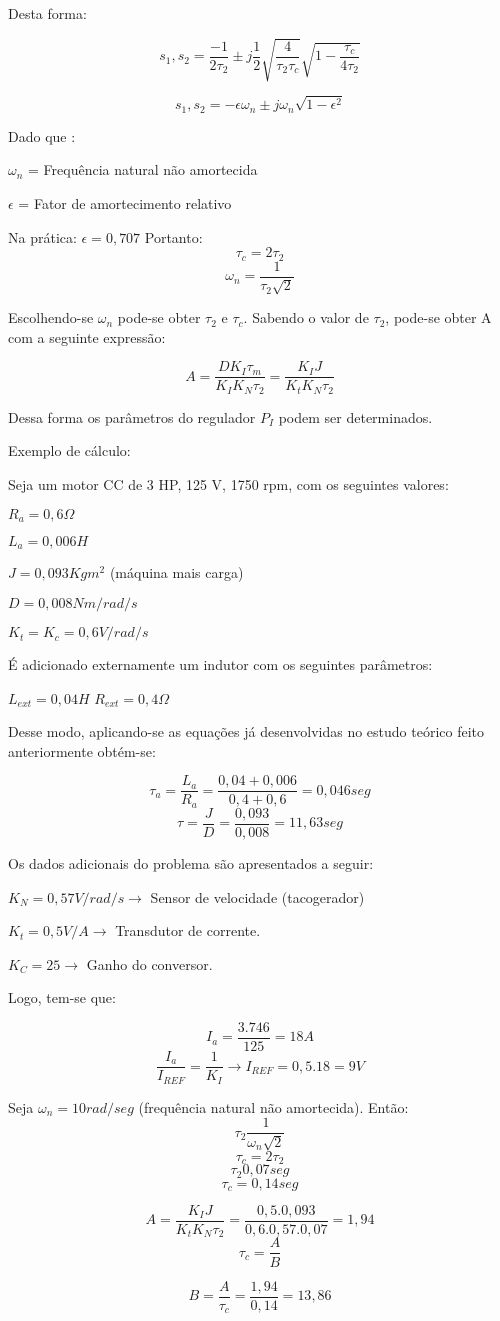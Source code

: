 Desta forma:

\[s_{1},s_{2} = \frac{-1}{2\tau_{2}} \pm j\frac{1}{2}\sqrt{\frac{4}{\tau_{2}\tau_{c}}}\sqrt{1 - \frac{\tau_{c}}{4\tau_{2}}}\]

\[s_{1},s_{2} = -\epsilon\omega_{n} \pm j\omega_{n}\sqrt{1 - \epsilon^{2}}\]

Dado que :

$\omega_{n}$ =  Frequência natural não amortecida

$\epsilon$ = Fator de amortecimento relativo


Na prática: $\epsilon = 0,707$
Portanto:
\[\tau_{c} = 2\tau_{2}\]
\[\omega_{n} = \frac{1}{\tau_{2}\sqrt{2}}\]

Escolhendo-se $\omega_{n}$ pode-se obter $\tau_{2}$ e $\tau_{c}$. Sabendo o valor de $\tau_{2}$, pode-se obter A com a seguinte expressão:

\[A = \frac{DK_{I}\tau_{m}}{K_{I}K_{N}\tau_{2}} = \frac{K_{I}J}{K_{t}K_{N}\tau_{2}}\]

Dessa forma os parâmetros do regulador $P_{I}$ podem ser determinados.

Exemplo de cálculo:

Seja um motor CC de 3 HP, 125 V, 1750 rpm, com os seguintes valores:

$R_{a} = 0,6 \Omega$ 

$L_{a} = 0,006 H$

$J = 0,093 Kgm^{2}$ (máquina mais carga)

$D = 0,008 Nm/rad/s$

$K_{t} = K_{c} = 0,6 V/rad/s$

É adicionado externamente um indutor com os seguintes parâmetros:

$L_{ext} = 0,04H$
$R_{ext} = 0,4\Omega$

Desse modo, aplicando-se as equações já desenvolvidas no estudo teórico feito anteriormente obtém-se:

\[\tau_{a} = \frac{L_{a}}{R_{a}} = \frac{0,04 + 0,006}{0,4 + 0,6} = 0,046 seg\]
\[\tau = \frac{J}{D} = \frac{0,093}{0,008} = 11,63 seg\]

Os dados adicionais do problema são apresentados a seguir:

$K_{N} = 0,57 V/rad/s  \rightarrow $ Sensor de velocidade (tacogerador)

$K_{t} = 0,5 V/A  \rightarrow$ Transdutor de corrente.

$K_{C} = 25  \rightarrow$ Ganho do conversor.

Logo, tem-se que:

\[I_{a} = \frac{3.746}{125} = 18A\]
\[\frac{I_{a}}{I_{REF}} = \frac{1}{K_{I}} \rightarrow I_{REF} = 0,5.18 = 9 V \]

Seja $\omega_{n} = 10 rad/seg$ (frequência natural não amortecida). Então:
\[\tau_{2} \frac{1}{\omega_{n}\sqrt{2}}\]
\[\tau_{c} = 2\tau_{2}\]
\[\tau_{2} 0,07 seg\]
\[\tau_{c} = 0,14 seg\]

\[A = \frac{K_{I}J}{K_{t}K_{N}\tau_{2}} = \frac{0,5.0,093}{0,6.0,57.0,07} = 1,94\]
\[\tau_{c} = \frac{A}{B}\]

\[B = \frac{A}{\tau_{c}} = \frac{1,94}{0,14} = 13,86 \]

